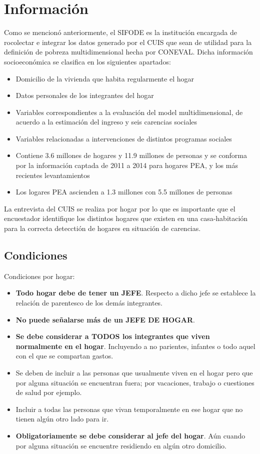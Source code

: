 \section{Información}
Como se mencionó anteriormente, el SIFODE es la institución encargada de rocolectar e integrar los datos generado por el CUIS que sean de utilidad para la definición de pobreza multidimensional hecha por CONEVAL. Dicha información socioeconómica se clasifica en los siguientes apartados:
\begin{itemize}
    \item Domicilio de la vivienda que habita regularmente el hogar
    \item Datos personales de los integrantes del hogar
    \item Variables correspondientes a la evaluación del model multidimensional, de acuerdo a la estimación del ingreso y seis carencias sociales
    \item Variables relacionadas a intervenciones de distintos programas sociales
    \item Contiene 3.6 millones de hogares y 11.9 millones de personas y se conforma por la información captada de 2011 a 2014 para hogares PEA, y los más recientes levantamientos
    \item Los logares PEA ascienden a 1.3 millones con 5.5 millones de personas
\end{itemize}

La entrevista del CUIS se realiza por hogar por lo que es importante que el encuestador identifique los distintos hogares que existen en una casa-habitación para la correcta detecctión de hogares en situación de carencias.\\

\subsection{Condiciones}
Condiciones por hogar:
\begin{itemize}
    \item \textbf{Todo hogar debe de tener un JEFE}. Respecto a dicho jefe se establece la relación de parentesco de los demás integrantes.
    \item \textbf{No puede señalarse más de un JEFE DE HOGAR}.
    \item \textbf{Se debe considerar a TODOS los integrantes que viven normalmente en el hogar}. Incluyendo a no parientes, infantes o todo aquel con el que se compartan gastos.
    \item Se deben de incluir a las personas que usualmente viven en el hogar pero que por alguna situación se encuentran fuera; por vacaciones, trabajo o cuestiones de salud por ejemplo.
    \item Incluir a todas las personas que vivan temporalmente en ese hogar que no tienen algún otro lado para ir.
    \item  \textbf{Obligatoriamente se debe considerar al jefe del hogar}. Aún cuando por alguna situación se encuentre residiendo en algún otro domicilio.
\end{itemize}
